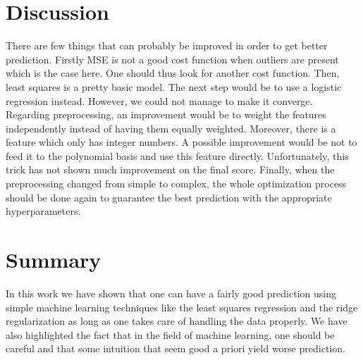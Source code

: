 \documentclass[10pt,conference,compsocconf]{IEEEtran}
\begin{document}
\section{Discussion}
There are few things that can probably be improved in order to get better prediction. Firstly MSE is not a good cost function when outliers are present which is the case here. One should thus look for another cost function. Then, least squares is a pretty basic model. The next step would be to use a logistic regression instead. However, we could not manage to make it converge.\\
Regarding preprocessing, an improvement would be to weight the features independently instead of having them equally weighted. Moreover, there is a feature which only has integer numbers. A possible improvement would be not to feed it to the polynomial basis and use this feature directly. Unfortunately, this trick has not shown much improvement on the final score. Finally, when the preprocessing changed from simple to complex, the whole optimization process should be done again to guarantee the best prediction with the appropriate hyperparameters.

\section{Summary}
In this work we have shown that one can have a fairly good prediction using simple machine learning techniques like the least squares regression and the ridge regularization as long as one takes care of handling the data properly. We have also highlighted the fact that in the field of machine learning, one should be careful and that some intuition that seem good a priori yield worse prediction.%







\end{document}
